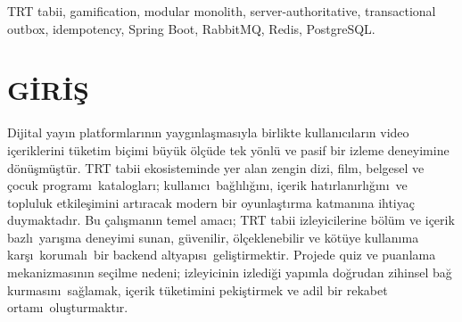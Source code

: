 \documentclass[conference,a4paper]{IEEEtran}
\begin{document}
\begin{abstract}
\textbf{\textit{English Abstract}---This paper presents the architectural design, implementation, and live deployment of an enterprise-grade, API-first backend platform that transforms the passive viewing experience of TRT tabii video streaming content into an interactive engagement through quizzes and gamification. Traditional client-centric quiz applications suffer from answer leakage, client-side timer manipulation, race conditions causing duplicate XP rewards, and severe database bottlenecks during real-time leaderboard aggregations. These challenges are resolved by introducing a server-authoritative gameplay engine, asynchronous event-driven messaging powered by the Transactional Outbox/Inbox pattern, and a generation-based Redis caching model. The core system is structured as a Modular Monolith adhering to Clean Architecture principles to eliminate distributed transaction overheads, while the read-heavy leaderboard projection is decoupled into an independently scalable Spring Boot microservice. The resulting platform has been deployed to Oracle Cloud Infrastructure utilizing an 8-container topology behind a Caddy reverse proxy and verified with 130 backend, 47 frontend, and containerized integration test suites.}
\end{abstract}

\begin{IEEEkeywords}
TRT tabii, gamification, modular monolith, server-authoritative, transactional outbox, idempotency, Spring Boot, RabbitMQ, Redis, PostgreSQL.
\end{IEEEkeywords}

\section{G\.{I}R\.{I}\c{S}}
Dijital yay\i n platformlar\i n\i n yayg\i nla\c{s}mas\i yla birlikte kullan\i c\i lar\i n video i\c{c}eriklerini t\"{u}ketim bi\c{c}imi b\"{u}y\"{u}k \"{o}l\c{c}\"{u}de tek y\"{o}nl\"{u} ve pasif bir izleme deneyimine d\"{o}n\"{u}\c{s}m\"{u}\c{s}t\"{u}r. TRT tabii ekosisteminde yer alan zengin dizi, film, belgesel ve \c{c}ocuk program\i\ kataloglar\i; kullan\i c\i\ ba\u{g}l\i l\i\u{g}\i n\i, i\c{c}erik hat\i rlan\i rl\i\u{g}\i n\i\ ve topluluk etkile\c{s}imini art\i racak modern bir oyunla\c{s}t\i rma katman\i na ihtiya\c{c} duymaktad\i r. Bu \c{c}al\i\c{s}man\i n temel amac\i; TRT tabii izleyicilerine b\"{o}l\"{u}m ve i\c{c}erik bazl\i\ yar\i\c{s}ma deneyimi sunan, g\"{u}venilir, \"{o}l\c{c}eklenebilir ve k\"{o}t\"{u}ye kullan\i ma kar\c{s}\i\ korumal\i\ bir backend altyap\i s\i\ geli\c{s}tirmektir. Projede quiz ve puanlama mekanizmas\i n\i n se\c{c}ilme nedeni; izleyicinin izledi\u{g}i yap\i mla do\u{g}rudan zihinsel ba\u{g} kurmas\i n\i\ sa\u{g}lamak, i\c{c}erik t\"{u}ketimini peki\c{s}tirmek ve adil bir rekabet ortam\i\ olu\c{s}turmakt\i r.
\end{document}
